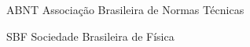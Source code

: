 \begin{siglas}
  \item[ABNT] Associação Brasileira de Normas Técnicas
  \item[SBF] Sociedade Brasileira de Física
\end{siglas}
%
%